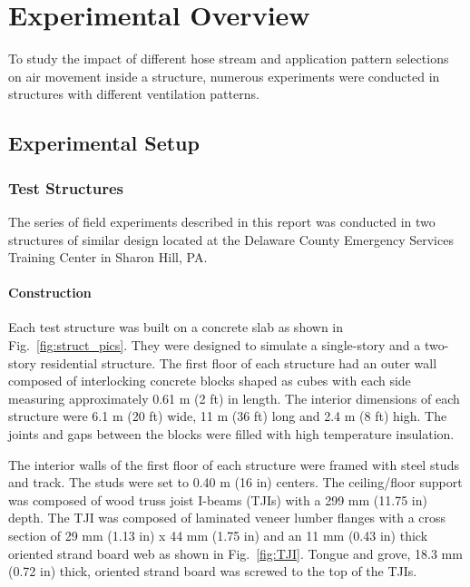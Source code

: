 \documentclass[12pt,oneside]{book}
\begin{document}
\chapter{Experimental Overview}
\label{chap:exp_overview}
To study the impact of different hose stream and application pattern selections on air movement inside a structure, numerous experiments were conducted in structures with different ventilation patterns. 

\section{Experimental Setup}
\label{sec:exp_setup}

\subsection{Test Structures}
\label{subsec:test_structs}
The series of field experiments described in this report was conducted in two structures of similar design located at the Delaware County Emergency Services Training Center in Sharon Hill, PA. 

\subsubsection{Construction}
\label{subsubsec:construction}
Each test structure was built on a concrete slab as shown in Fig.~\ref{fig:struct_pics}. They were designed to simulate a single-story and a two-story residential structure. The first floor of each structure had an outer wall composed of interlocking concrete blocks shaped as cubes with each side measuring approximately 0.61 m (2 ft) in length. The interior dimensions of each structure were 6.1 m (20 ft) wide, 11 m (36 ft) long and 2.4 m (8 ft) high. The joints and gaps between the blocks were filled with high temperature insulation.

The interior walls of the first floor of each structure were framed with steel studs and track. The studs were set to 0.40 m (16 in) centers. The ceiling/floor support was composed of wood truss joist I-beams (TJIs) with a 299 mm (11.75 in) depth. The TJI was composed of laminated veneer lumber flanges with a cross section of 29 mm (1.13 in) x 44 mm (1.75 in) and an 11 mm (0.43 in) thick oriented strand board web as shown in Fig.~\ref{fig:TJI}. Tongue and grove, 18.3 mm (0.72 in) thick, oriented strand board was screwed to the top of the TJIs.
\end{document}
